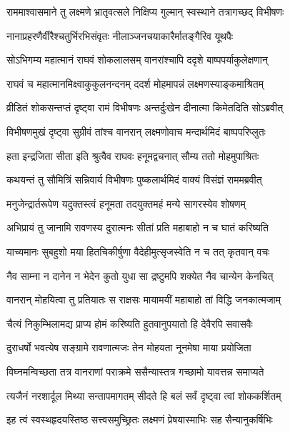 
\twolineshloka
{राममाश्वासमाने तु लक्ष्मणे भ्रातृवत्सले}
{निक्षिप्य गुल्मान् स्वस्थाने तत्रागच्छद् विभीषणः} %

\twolineshloka
{नानाप्रहरणैर्वीरैश्चतुर्भिरभिसंवृतः}
{नीलाञ्जनचयाकारैर्मातङ्गैरिव यूथपैः} %

\twolineshloka
{सोऽभिगम्य महात्मानं राघवं शोकलालसम्}
{वानरांश्चापि ददृशे बाष्पपर्याकुलेक्षणान्} %

\twolineshloka
{राघवं च महात्मानमिक्ष्वाकुकुलनन्दनम्}
{ददर्श मोहमापन्नं लक्ष्मणस्याङ्कमाश्रितम्} %

\twolineshloka
{व्रीडितं शोकसन्तप्तं दृष्ट्वा रामं विभीषणः}
{अन्तर्दुःखेन दीनात्मा किमेतदिति सोऽब्रवीत्} %

\twolineshloka
{विभीषणमुखं दृष्ट्वा सुग्रीवं तांश्च वानरान्}
{लक्ष्मणोवाच मन्दार्थमिदं बाष्पपरिप्लुतः} %

\twolineshloka
{हता इन्द्रजिता सीता इति श्रुत्वैव राघवः}
{हनूमद्वचनात् सौम्य ततो मोहमुपाश्रितः} %

\twolineshloka
{कथयन्तं तु सौमित्रिं सन्निवार्य विभीषणः}
{पुष्कलार्थमिदं वाक्यं विसंज्ञं राममब्रवीत्} %

\twolineshloka
{मनुजेन्द्रार्तरूपेण यदुक्तस्त्वं हनूमता}
{तदयुक्तमहं मन्ये सागरस्येव शोषणम्} %

\twolineshloka
{अभिप्रायं तु जानामि रावणस्य दुरात्मनः}
{सीतां प्रति महाबाहो न च घातं करिष्यति} %

\twolineshloka
{याच्यमानः सुबहुशो मया हितचिकीर्षुणा}
{वैदेहीमुत्सृजस्वेति न च तत् कृतवान् वचः} %

\twolineshloka
{नैव साम्ना न दानेन न भेदेन कुतो युधा}
{सा द्रष्टुमपि शक्येत नैव चान्येन केनचित्} %

\twolineshloka
{वानरान् मोहयित्वा तु प्रतियातः स राक्षसः}
{मायामयीं महाबाहो तां विद्धि जनकात्मजाम्} %

\twolineshloka
{चैत्यं निकुम्भिलामद्य प्राप्य होमं करिष्यति}
{हुतवानुपयातो हि देवैरपि सवासवैः} %

\twolineshloka
{दुराधर्षो भवत्येष सङ्ग्रामे रावणात्मजः}
{तेन मोहयता नूनमेषा माया प्रयोजिता} %

\twolineshloka
{विघ्नमन्विच्छता तत्र वानराणां पराक्रमे}
{ससैन्यास्तत्र गच्छामो यावत्तन्न समाप्यते} %

\twolineshloka
{त्यजैनं नरशार्दूल मिथ्या सन्तापमागतम्}
{सीदते हि बलं सर्वं दृष्ट्वा त्वां शोककर्शितम्} %

\twolineshloka
{इह त्वं स्वस्थहृदयस्तिष्ठ सत्त्वसमुच्छ्रितः}
{लक्ष्मणं प्रेषयास्माभिः सह सैन्यानुकर्षिभिः} %

